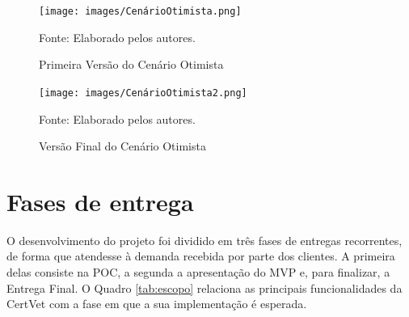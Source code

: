 \documentclass[
    12pt,               %
    openright,          %
    oneside,
    a4paper,            %
    BIBLATEX,           %
    TODO,               %
    english,            %
    brazil              %
    ]{ifsp-spo-inf-ctds}
\begin{document}
            \begin{figure}[H]
                \centering
                \caption{Primeira Versão do Cenário Otimista}
                \texttt{[image: images/CenárioOtimista.png]}
                
                \label{fig:cenarioOtimistaGrafico}
                \centering
            \footnotesize Fonte: Elaborado pelos autores.
            \end{figure}
            
            
            \begin{figure}[H]
                \centering
                 \caption{Versão Final do Cenário Otimista}
                \texttt{[image: images/CenárioOtimista2.png]}
               
                \label{fig:cenarioOtimistaGrafico2}
                \centering
            \footnotesize Fonte: Elaborado pelos autores.
            \end{figure}
    
    \section{Fases de entrega}
    
        O desenvolvimento do projeto foi dividido em três fases de entregas recorrentes, de forma que atendesse à demanda recebida por parte dos clientes. A primeira delas consiste na POC, a segunda a apresentação do MVP e, para finalizar, a Entrega Final. O Quadro \ref{tab:escopo} relaciona as principais funcionalidades da CertVet com a fase em que a sua implementação é esperada.
    
\end{document}
